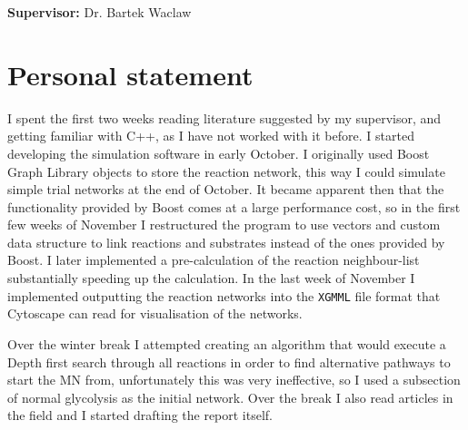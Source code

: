 \documentclass[a4paper,12pt]{article}
\begin{document}
\vfill
{\bf Supervisor:} Dr. Bartek Waclaw
\newpage



\setcounter{page}{1}
\footruleheight{1pt}
\headruleheight{1pt}
\rhead{- \thepage}
\cfoot{}

\cleardoublepage
\tableofcontents



%	
%
%
%
%
%
%


	\newpage
	\section*{Personal statement}
	I spent the first two weeks reading literature suggested by my supervisor, and getting familiar with C++, as I have not worked with it before. 
	I started developing the simulation software in early October. 	I originally used Boost Graph Library objects to store the reaction network, this way I could simulate simple trial networks at the end of October. It became apparent then that the functionality provided by Boost comes at a large performance cost, so in the first few weeks of November I restructured the program to use vectors and custom data structure to link reactions and substrates instead of the ones provided by Boost. I later implemented a pre-calculation of the reaction neighbour-list substantially speeding up the calculation. 
	In the last week of November I implemented outputting the reaction networks into the \texttt{XGMML} file format that Cytoscape can read for visualisation of the networks. 

	Over the winter break I attempted creating an algorithm that would execute a Depth first search through all reactions in order to find alternative pathways to start the MN from, unfortunately this was very ineffective, so I used a subsection of normal glycolysis as the initial network. Over the break I also read articles in the field and I started drafting the report itself. 
\end{document}
